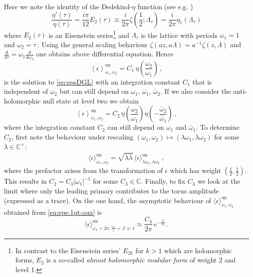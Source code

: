 \documentclass[11pt,a4paper]{article}
\numberwithin{equation}{section}
\begin{document}
\noindent
Here we note the identity of the Dedekind-$\eta$ function (see e.g. \cite[Eq.\,(5.6)]{Kilford:2008})
%
\begin{equation}
    \frac{\eta'(\tau)}{\eta(\tau)} = \frac{i\pi}{12} E_2(\tau) \equiv \frac{i}{2\pi} \zeta\left(\frac{1}{2};\Lambda_\tau\right) = \frac{i}{2\pi} \eta_1(\Lambda_\tau)
\end{equation}
%
where $E_2(\tau)$ is an Eisenstein series\footnote{In contrast to the Eisenstein series' $E_{2k}$ for $k>1$ which are holomorphic forms, $E_2$ is a so-called \textit{almost holomorphic modular form} of weight 2 and level 1.} and $\Lambda_\tau$ is the lattice with periods $\omega_1 = 1$ and $\omega_2=\tau$\,. Using the general scaling behaviour $\zeta(az,a\Lambda) = a^{-1} \zeta(z,\Lambda)$ and $\frac{d}{d\tau} = \omega_1 \frac{d}{d\omega_2}$ one obtains above differential equation.
Hence 
%
\begin{equation}
     \left\langle \epsilon \right\rangle_{\omega_1,\omega_2}^\mathrm{un} = C_1 \, \eta\!\left(\frac{\omega_2}{\omega_1}\right)\,,
\end{equation}
%
is the solution to \eqref{eq:epsDGL} with an integration constant $C_1$ that is independent of $\omega_2$ but can still depend on $\omega_1$, $\overline\omega_1$, $\overline\omega_2$.
If we also consider the anti-holomorphic null state at level two we obtain 
%
\begin{equation}\label{eq:eps-1pt-aux}
     \left\langle \epsilon \right\rangle_{\omega_1,\omega_2}^\mathrm{un} = C_2 \, \eta\!\left(\frac{\omega_2}{\omega_1}\right) \eta\!\left(-\frac{\bar{\omega}_2}{\bar{\omega}_1}\right) \,,
\end{equation}
%
where the integration constant $C_2$ can still depend on $\omega_1$ and $\bar{\omega}_1$. 
To determine $C_2$, first note the behaviour under rescaling $(\omega_1,\omega_2) \mapsto (\lambda \omega_1,\lambda \omega_2)$ 
for some $\lambda \in \mathbb{C}^\times$:
%
\begin{align}
\big\langle \epsilon \big\rangle_{\omega_1,\omega_2}^\mathrm{un} = \sqrt{\lambda \bar{\lambda}} \, \big\langle \epsilon \big\rangle_{\lambda\omega_1,\lambda\omega_2}^\mathrm{un} ~,
\end{align}
%
where the prefactor arises from the transformation of $\epsilon$ which has weight $(\frac12,\frac12)$. This results in $C_2 = C_3 |\omega_1|^{-1}$ for some $C_3 \in \mathbb{C}$. Finally, to fix $C_3$ we look at the limit where only the leading primary contributes to the torus amplitude (expressed as a trace). On the one hand, the asymptotic behaviour of $\langle \epsilon \rangle_{\omega_1,\omega_2}^\mathrm{un}$ obtained from \eqref{eq:eps-1pt-aux} is
%
\begin{equation}
    \big\langle \epsilon   \big\rangle^\mathrm{un}_{\omega_1=2\pi,\frac{\omega_2}{i}=\beta\gg 1} 
    \approx \frac{C_3}{2\pi} \,e^{-\frac{\beta}{12}}\,.
\end{equation}
\end{document}
